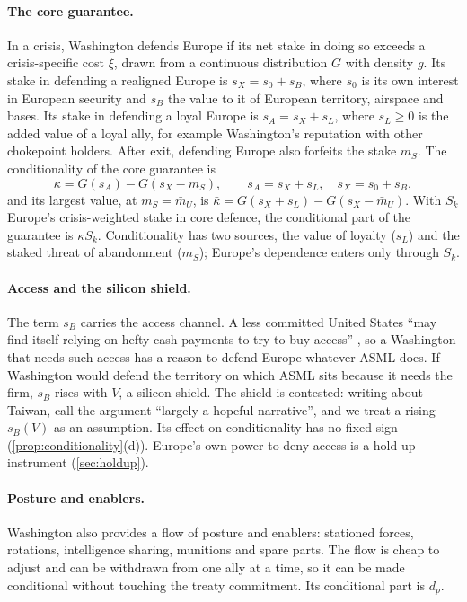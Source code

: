 \paragraph{The core guarantee.} In a crisis, Washington defends Europe if its net stake in doing so exceeds a crisis-specific cost $\xi$, drawn from a continuous distribution $G$ with density $g$. Its stake in defending a realigned Europe is $s_X=s_0+s_B$, where $s_0$ is its own interest in European security and $s_B$ the value to it of European territory, airspace and bases. Its stake in defending a loyal Europe is $s_A=s_X+s_L$, where $s_L\ge 0$ is the added value of a loyal ally, for example Washington's reputation with other chokepoint holders. After exit, defending Europe also forfeits the stake $m_S$. The conditionality of the core guarantee is
\begin{equation}\label{eq:kappa}
\kappa=G(s_A)-G(s_X-m_S),\qquad s_A=s_X+s_L,\quad s_X=s_0+s_B,
\end{equation}
and its largest value, at $m_S=\bar m_U$, is $\bar\kappa=G(s_X+s_L)-G(s_X-\bar m_U)$. With $S_k$ Europe's crisis-weighted stake in core defence, the conditional part of the guarantee is $\kappa S_k$. Conditionality has two sources, the value of loyalty ($s_L$) and the staked threat of abandonment ($m_S$); Europe's dependence enters only through $S_k$.

\paragraph{Access and the silicon shield.} The term $s_B$ carries the access channel. A less committed United States ``may find itself relying on hefty cash payments to try to buy access'' \citep{carson2025allies}, so a Washington that needs such access has a reason to defend Europe whatever ASML does. If Washington would defend the territory on which ASML sits because it needs the firm, $s_B$ rises with $V$, a silicon shield. The shield is contested: writing about Taiwan, \citet{weil2025european} call the argument ``largely a hopeful narrative'', and we treat a rising $s_B(V)$ as an assumption. Its effect on conditionality has no fixed sign (\cref{prop:conditionality}(d)). Europe's own power to deny access is a hold-up instrument (\cref{sec:holdup}).

\paragraph{Posture and enablers.} Washington also provides a flow of posture and enablers: stationed forces, rotations, intelligence sharing, munitions and spare parts. The flow is cheap to adjust and can be withdrawn from one ally at a time, so it can be made conditional without touching the treaty commitment. Its conditional part is $d_p$.


